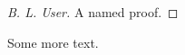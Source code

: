 \documentclass{article}
\begin{document}

\begin{proof}[B. L. User]
  A named proof.
\end{proof}

\begin{foo}
 \kant[1]
\end{foo}

\begin{baz}[of theorem 1]
 \kant[2]  Some more text.
\end{baz}
\end{document}
